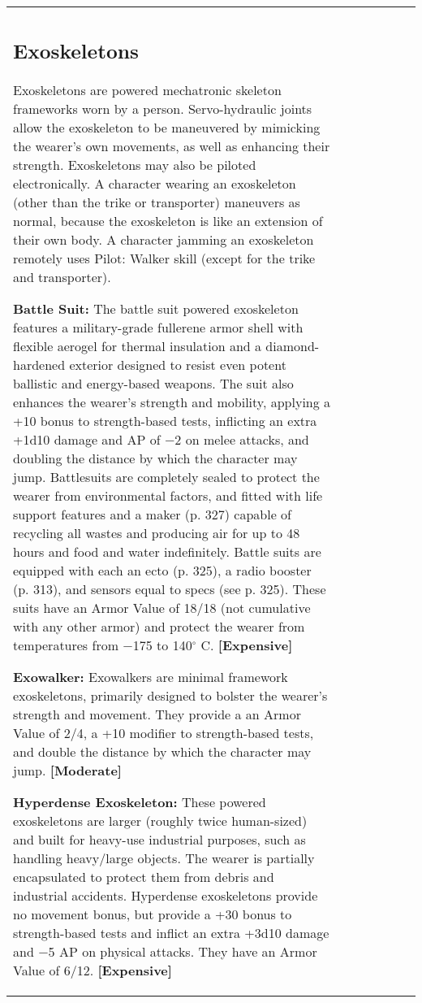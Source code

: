 \begin{tabular}{|l|l|l|l|l|l|l|}
\subsection{Exoskeletons} \label{sec:exoskeletons} 

Exoskeletons are powered mechatronic skeleton frameworks worn by a person. Servo-hydraulic joints allow the exoskeleton to be maneuvered by mimicking the wearer’s own movements, as well as enhancing their strength. Exoskeletons may also be piloted electronically. A character wearing an exoskeleton (other than the trike or transporter) maneuvers as normal, because the exoskeleton is like an extension of their own body. A character jamming an exoskeleton remotely uses Pilot: Walker skill (except for the trike and transporter). 

\textbf{Battle Suit:} The battle suit powered exoskeleton features a military-grade fullerene armor shell with flexible aerogel for thermal insulation and a diamond-hardened exterior designed to resist even potent ballistic and energy-based weapons. The suit also enhances the wearer’s strength and mobility, applying a +10 bonus to strength-based tests, inflicting an extra +1d10 damage and AP of $-$2 on melee attacks, and doubling the distance by which the character may jump. Battlesuits are completely sealed to protect the wearer from environmental factors, and fitted with life support features and a maker (p. 327) capable of recycling all wastes and producing air for up to 48 hours and food and water indefinitely. Battle suits are equipped with each an ecto (p. 325), a radio booster (p. 313), and sensors equal to specs (see p. 325). These suits have an Armor Value of 18/18 (not cumulative with any other armor) and protect the wearer from temperatures from $-$175 to 140$^{\circ}$ C. \textbf{[Expensive]} 

\textbf{Exowalker:} Exowalkers are minimal framework exoskeletons, primarily designed to bolster the wearer’s strength and movement. They provide a an Armor Value of 2/4, a +10 modifier to strength-based tests, and double the distance by which the character may jump. \textbf{[Moderate]} 

\textbf{Hyperdense Exoskeleton:} These powered exoskeletons are larger (roughly twice human-sized) and built for heavy-use industrial purposes, such as handling heavy/large objects. The wearer is partially encapsulated to protect them from debris and industrial accidents. Hyperdense exoskeletons provide no movement bonus, but provide a +30 bonus to strength-based tests and inflict an extra +3d10 damage and $-$5 AP on physical attacks. They have an Armor Value of 6/12. \textbf{[Expensive]} 


\end{tabular}
